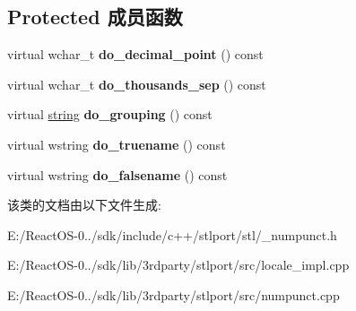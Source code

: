 \subsection*{Protected 成员函数}
\begin{DoxyCompactItemize}
\item 
\mbox{\label{classnumpunct_3_01wchar__t_01_4_a99ddcab249666d3427948465d18d5bf0}} 
virtual wchar\+\_\+t {\bfseries do\+\_\+decimal\+\_\+point} () const
\item 
\mbox{\label{classnumpunct_3_01wchar__t_01_4_a5f59c816f9680ebd316722271a5c4054}} 
virtual wchar\+\_\+t {\bfseries do\+\_\+thousands\+\_\+sep} () const
\item 
\mbox{\label{classnumpunct_3_01wchar__t_01_4_add010ec39cfe47e6ed02570e7feb4e7d}} 
virtual \hyperlink{structstring}{string} {\bfseries do\+\_\+grouping} () const
\item 
\mbox{\label{classnumpunct_3_01wchar__t_01_4_a8eca57cad120937a6d31c9e387c31bdc}} 
virtual wstring {\bfseries do\+\_\+truename} () const
\item 
\mbox{\label{classnumpunct_3_01wchar__t_01_4_aebc58d2f92ab2ffb69834b3321f4650c}} 
virtual wstring {\bfseries do\+\_\+falsename} () const
\end{DoxyCompactItemize}


该类的文档由以下文件生成\+:\begin{DoxyCompactItemize}
\item 
E\+:/\+React\+O\+S-\/0../sdk/include/c++/stlport/stl/\+\_\+numpunct.\+h\item 
E\+:/\+React\+O\+S-\/0../sdk/lib/3rdparty/stlport/src/locale\+\_\+impl.\+cpp\item 
E\+:/\+React\+O\+S-\/0../sdk/lib/3rdparty/stlport/src/numpunct.\+cpp\end{DoxyCompactItemize}
